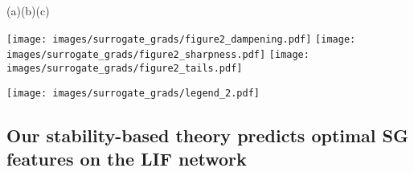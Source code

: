 \begin{figure*}
    {\footnotesize \hspace{1.2cm}(a)\hspace{5.6cm}(b)\hspace{5.6cm}(c)}
    
    \centering
    \texttt{[image: images/surrogate\_grads/figure2\_dampening.pdf]}
    \texttt{[image: images/surrogate\_grads/figure2\_sharpness.pdf]}
    \texttt{[image: images/surrogate\_grads/figure2\_tails.pdf]}
    
    \texttt{[image: images/surrogate\_grads/legend\_2.pdf]}

    \caption{\textbf{Our stability-based theory predicts optimal SG features on the LIF network.} We compare how the features of SG shape predicted by our method stand up against other experimental choices. We conduct the analysis on the LIF network for the sl-MNIST task. Panel (a) shows the performance for different dampening values while setting the sharpness to 1, and vice versa in panel (b). The dashed vertical lines show our theoretical predictions for the exponential SG, (III) for the dampening ($\gamma=0.20\pm 0.02$) and (IV) for the sharpness ($\beta=1.02\pm 0.17$), which agree with the experiments. Dampenings lower than 1 improve performance while the pattern is the opposite for sharpness. Panel (c) shows the performance for different tail-fatness values on the $q$-PseudoSpike SG with $\beta=\gamma=1$. The theoretical prediction gives a close to optimal $q=1.898\pm 0.002$, whereas the best experimental result is $q=1.56$. These findings suggest that our stability-based method predicts good SG features before training, thereby reducing the need for time-consuming hyper-parameter search. }
    \label{fig:sensitivity_to_dsf}
\end{figure*}



\subsection{Our stability-based theory predicts optimal SG features on the LIF network}
\label{sec:heavy_tails}

